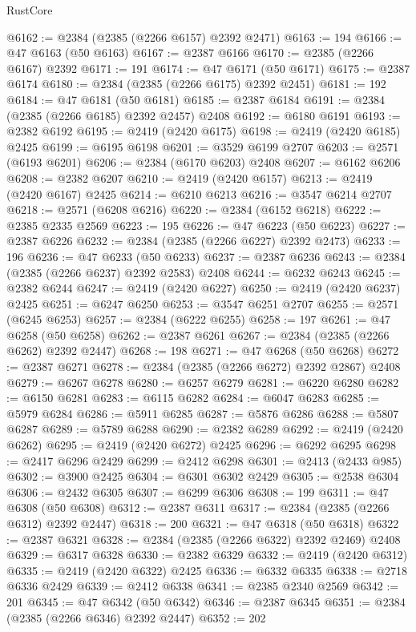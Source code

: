 \begin{lexlean}{RustCore}
\begin{coremodule}
@6162 := @2384 (@2385 (@2266 @6157) @2392 @2471)
@6163 := 194
@6166 := @47 @6163 (@50 @6163)
@6167 := @2387 @6166
@6170 := @2385 (@2266 @6167) @2392
@6171 := 191
@6174 := @47 @6171 (@50 @6171)
@6175 := @2387 @6174
@6180 := @2384 (@2385 (@2266 @6175) @2392 @2451)
@6181 := 192
@6184 := @47 @6181 (@50 @6181)
@6185 := @2387 @6184
@6191 := @2384 (@2385 (@2266 @6185) @2392 @2457) @2408
@6192 := @6180 @6191
@6193 := @2382 @6192
@6195 := @2419 (@2420 @6175)
@6198 := @2419 (@2420 @6185) @2425
@6199 := @6195 @6198
@6201 := @3529 @6199 @2707
@6203 := @2571 (@6193 @6201)
@6206 := @2384 (@6170 @6203) @2408
@6207 := @6162 @6206
@6208 := @2382 @6207
@6210 := @2419 (@2420 @6157)
@6213 := @2419 (@2420 @6167) @2425
@6214 := @6210 @6213
@6216 := @3547 @6214 @2707
@6218 := @2571 (@6208 @6216)
@6220 := @2384 (@6152 @6218)
@6222 := @2385 @2335 @2569
@6223 := 195
@6226 := @47 @6223 (@50 @6223)
@6227 := @2387 @6226
@6232 := @2384 (@2385 (@2266 @6227) @2392 @2473)
@6233 := 196
@6236 := @47 @6233 (@50 @6233)
@6237 := @2387 @6236
@6243 := @2384 (@2385 (@2266 @6237) @2392 @2583) @2408
@6244 := @6232 @6243
@6245 := @2382 @6244
@6247 := @2419 (@2420 @6227)
@6250 := @2419 (@2420 @6237) @2425
@6251 := @6247 @6250
@6253 := @3547 @6251 @2707
@6255 := @2571 (@6245 @6253)
@6257 := @2384 (@6222 @6255)
@6258 := 197
@6261 := @47 @6258 (@50 @6258)
@6262 := @2387 @6261
@6267 := @2384 (@2385 (@2266 @6262) @2392 @2447)
@6268 := 198
@6271 := @47 @6268 (@50 @6268)
@6272 := @2387 @6271
@6278 := @2384 (@2385 (@2266 @6272) @2392 @2867) @2408
@6279 := @6267 @6278
@6280 := @6257 @6279
@6281 := @6220 @6280
@6282 := @6150 @6281
@6283 := @6115 @6282
@6284 := @6047 @6283
@6285 := @5979 @6284
@6286 := @5911 @6285
@6287 := @5876 @6286
@6288 := @5807 @6287
@6289 := @5789 @6288
@6290 := @2382 @6289
@6292 := @2419 (@2420 @6262)
@6295 := @2419 (@2420 @6272) @2425
@6296 := @6292 @6295
@6298 := @2417 @6296 @2429
@6299 := @2412 @6298
@6301 := @2413 (@2433 @985)
@6302 := @3900 @2425
@6304 := @6301 @6302 @2429
@6305 := @2538 @6304
@6306 := @2432 @6305
@6307 := @6299 @6306
@6308 := 199
@6311 := @47 @6308 (@50 @6308)
@6312 := @2387 @6311
@6317 := @2384 (@2385 (@2266 @6312) @2392 @2447)
@6318 := 200
@6321 := @47 @6318 (@50 @6318)
@6322 := @2387 @6321
@6328 := @2384 (@2385 (@2266 @6322) @2392 @2469) @2408
@6329 := @6317 @6328
@6330 := @2382 @6329
@6332 := @2419 (@2420 @6312)
@6335 := @2419 (@2420 @6322) @2425
@6336 := @6332 @6335
@6338 := @2718 @6336 @2429
@6339 := @2412 @6338
@6341 := @2385 @2340 @2569
@6342 := 201
@6345 := @47 @6342 (@50 @6342)
@6346 := @2387 @6345
@6351 := @2384 (@2385 (@2266 @6346) @2392 @2447)
@6352 := 202

\end{coremodule}
\end{lexlean}
